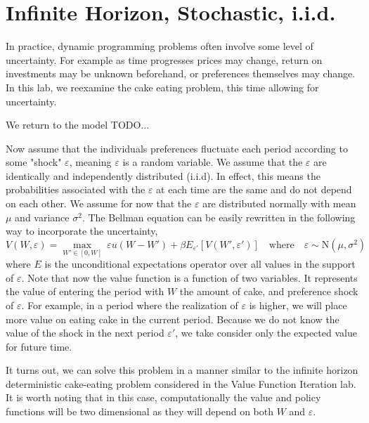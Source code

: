 \newcommand\ve{\varepsilon}


\section{Infinite Horizon, Stochastic, i.i.d.}\label{SecRecProbInfinHorStochiid}

In practice, dynamic programming problems often involve some level of uncertainty.  For example as time progresses prices may change, return on investments may be unknown beforehand, or preferences themselves may change.  In this lab, we reexamine the cake eating problem, this time allowing for uncertainty.

We return to the model TODO...

Now assume that the individuals preferences fluctuate each period according to some "shock" $\ve$, meaning $\ve$ is a random variable.  We assume that the $\ve$ are identically and independently distributed (i.i.d).  In effect, this means the probabilities associated with the $\ve$ at each time are the same and do not depend on each other.  We assume for now that the $\ve$ are distributed normally with mean $\mu$ and variance $\sigma^2$.  The Bellman equation can be easily rewritten in the following way to incorporate the uncertainty,
\begin{equation*}\label{stoch_Bellman}
   V\left(W,\ve\right) = \max_{W'\in[0,W]}\: \ve u\left(W - W'\right) + \beta E_{\ve'}\left[V\left(W',\ve'\right)\right] \quad\text{where}\quad \ve \sim \text{N}(\mu,\sigma^2)
\end{equation*}
where $E$ is the unconditional expectations operator over all values in the support of $\ve$.  Note that now the value function is a function of two variables.  It represents the value of entering the period with $W$ the amount of cake, and preference shock of $\ve$.  For example, in a period where the realization of $\ve$ is higher, we will place more value on eating cake in the current period.  Because we do not know the value of the shock in the next period $\ve'$, we take consider only the expected value for future time.

It turns out, we can solve this problem in a manner similar to the infinite horizon deterministic cake-eating problem considered in the Value Function Iteration lab.  It is worth noting that in this case, computationally the value and policy functions will be two dimensional as they will depend on both $W$ and $\ve$.

